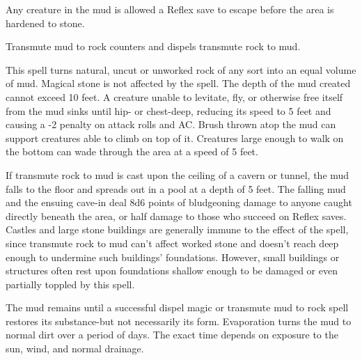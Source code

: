 \begin{multicols}{2}
\begin{small}
\smallskip\noindent Any creature in the mud is allowed a Reflex save to escape before the area is hardened to stone.

\smallskip\noindent Transmute mud to rock counters and dispels transmute rock to mud.


\noindent This spell turns natural, uncut or unworked rock of any sort into an equal volume of mud. Magical stone is not affected by the spell. The depth of the mud created cannot exceed 10 feet. A creature unable to levitate, fly, or otherwise free itself from the mud sinks until hip- or chest-deep, reducing its speed to 5 feet and causing a -2 penalty on attack rolls and AC. Brush thrown atop the mud can support creatures able to climb on top of it. Creatures large enough to walk on the bottom can wade through the area at a speed of 5 feet.

\smallskip\noindent If transmute rock to mud is cast upon the ceiling of a cavern or tunnel, the mud falls to the floor and spreads out in a pool at a depth of 5 feet. The falling mud and the ensuing cave-in deal 8d6 points of bludgeoning damage to anyone caught directly beneath the area, or half damage to those who succeed on Reflex saves.
Castles and large stone buildings are generally immune to the effect of the spell, since transmute rock to mud can't affect worked stone and doesn't reach deep enough to undermine such buildings' foundations. However, small buildings or structures often rest upon foundations shallow enough to be damaged or even partially toppled by this spell.

\smallskip\noindent The mud remains until a successful dispel magic or transmute mud to rock spell restores its substance-but not necessarily its form. Evaporation turns the mud to normal dirt over a period of days. The exact time depends on exposure to the sun, wind, and normal drainage.



\end{small}
\end{multicols}
